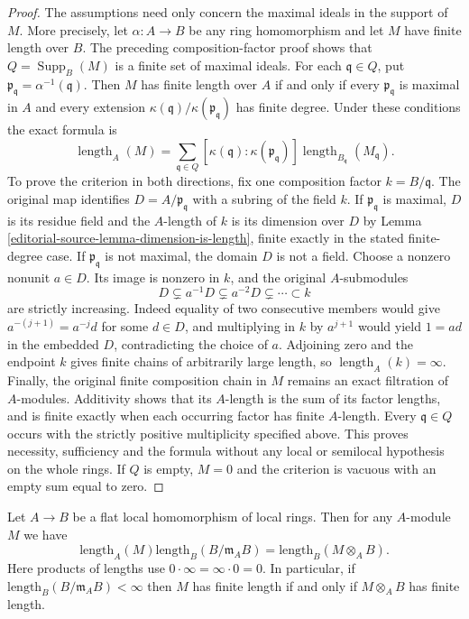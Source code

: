 \begin{proof}
The assumptions need only concern the maximal ideals in the
support of $M$. More precisely, let $\alpha:A\to B$ be any
ring homomorphism and let $M$ have finite length over $B$.
The preceding composition-factor proof shows that
$Q=\operatorname{Supp}_B(M)$ is a finite set of maximal ideals.
For each $\mathfrak q\in Q$, put
$\mathfrak p_{\mathfrak q}=\alpha^{-1}(\mathfrak q)$.
Then $M$ has finite length over $A$ if and only if every
$\mathfrak p_{\mathfrak q}$ is maximal in $A$ and every
extension $\kappa(\mathfrak q)/\kappa(\mathfrak p_{\mathfrak q})$
has finite degree. Under these conditions the exact formula is
$$
\operatorname{length}_A(M)
=\sum_{\mathfrak q\in Q}
[\kappa(\mathfrak q):\kappa(\mathfrak p_{\mathfrak q})]
\operatorname{length}_{B_{\mathfrak q}}(M_{\mathfrak q}).
$$
To prove the criterion in both directions, fix one composition
factor $k=B/\mathfrak q$. The original map identifies
$D=A/\mathfrak p_{\mathfrak q}$ with a subring of the field $k$.
If $\mathfrak p_{\mathfrak q}$ is maximal, $D$ is its residue
field and the $A$-length of $k$ is its dimension over $D$ by
Lemma \ref{editorial-source-lemma-dimension-is-length}, finite exactly in the
stated finite-degree case.
If $\mathfrak p_{\mathfrak q}$ is not maximal, the domain $D$
is not a field. Choose a nonzero nonunit $a\in D$.
Its image is nonzero in $k$, and the original $A$-submodules
$$
D\subsetneq a^{-1}D\subsetneq a^{-2}D\subsetneq\cdots\subset k
$$
are strictly increasing. Indeed equality of two consecutive
members would give $a^{-(j+1)}=a^{-j}d$ for some $d\in D$,
and multiplying in $k$ by $a^{j+1}$ would yield $1=ad$ in
the embedded $D$, contradicting the choice of $a$.
Adjoining zero and the endpoint $k$ gives finite chains of
arbitrarily large length, so $\operatorname{length}_A(k)=\infty$.
Finally, the original finite composition chain in $M$ remains
an exact filtration of $A$-modules. Additivity shows that its
$A$-length is the sum of its factor lengths, and is finite
exactly when each occurring factor has finite $A$-length.
Every $\mathfrak q\in Q$ occurs with the strictly positive
multiplicity specified above. This proves necessity, sufficiency
and the formula without any local or semilocal hypothesis on
the whole rings. If $Q$ is empty, $M=0$ and the criterion is
vacuous with an empty sum equal to zero.
\end{proof}

\begin{lemma}
\label{editorial-source-lemma-pullback-module}
Let $A \to B$ be a flat local homomorphism of local rings.
Then for any $A$-module $M$ we have
$$
\text{length}_A(M) \text{length}_B(B/\mathfrak m_AB)
=
\text{length}_B(M \otimes_A B).
$$
Here products of lengths use $0\cdot\infty=\infty\cdot0=0$.
In particular, if $\text{length}_B(B/\mathfrak m_AB) < \infty$
then $M$ has finite length if and only if $M \otimes_A B$ has finite length.
\end{lemma}

